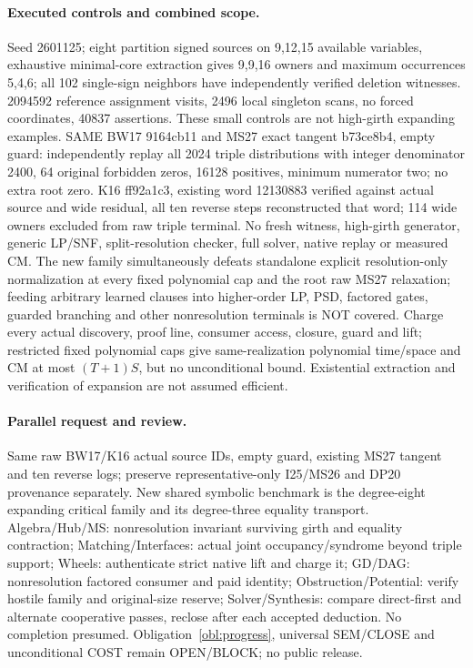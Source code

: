 \documentclass[11pt]{article}
\begin{document}
\paragraph{Executed controls and combined scope.}
Seed 2601125; eight partition signed sources on 9,12,15 available variables, exhaustive minimal-core extraction gives 9,9,16 owners and maximum occurrences 5,4,6; all 102 single-sign neighbors have independently verified deletion witnesses. 2094592 reference assignment visits, 2496 local singleton scans, no forced coordinates, 40837 assertions. These small controls are not high-girth expanding examples. SAME BW17 9164cb11 and MS27 exact tangent b73ce8b4, empty guard: independently replay all 2024 triple distributions with integer denominator 2400, 64 original forbidden zeros, 16128 positives, minimum numerator two; no extra root zero. K16 ff92a1c3, existing word 12130883 verified against actual source and wide residual, all ten reverse steps reconstructed that word; 114 wide owners excluded from raw triple terminal. No fresh witness, high-girth generator, generic LP/SNF, split-resolution checker, full solver, native replay or measured CM. The new family simultaneously defeats standalone explicit resolution-only normalization at every fixed polynomial cap and the root raw MS27 relaxation; feeding arbitrary learned clauses into higher-order LP, PSD, factored gates, guarded branching and other nonresolution terminals is NOT covered. Charge every actual discovery, proof line, consumer access, closure, guard and lift; restricted fixed polynomial caps give same-realization polynomial time/space and CM at most $(T+1)S$, but no unconditional bound. Existential extraction and verification of expansion are not assumed efficient.
\paragraph{Parallel request and review.}
Same raw BW17/K16 actual source IDs, empty guard, existing MS27 tangent and ten reverse logs; preserve representative-only I25/MS26 and DP20 provenance separately. New shared symbolic benchmark is the degree-eight expanding critical family and its degree-three equality transport. Algebra/Hub/MS: nonresolution invariant surviving girth and equality contraction; Matching/Interfaces: actual joint occupancy/syndrome beyond triple support; Wheels: authenticate strict native lift and charge it; GD/DAG: nonresolution factored consumer and paid identity; Obstruction/Potential: verify hostile family and original-size reserve; Solver/Synthesis: compare direct-first and alternate cooperative passes, reclose after each accepted deduction. No completion presumed. Obligation~\ref{obl:progress}, universal SEM/CLOSE and unconditional COST remain OPEN/BLOCK; no public release.
\end{document}
